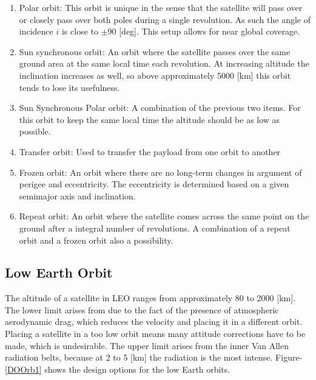 \begin{enumerate}
	\item Polar orbit:
	This orbit is unique in the sense that the satellite will pass over or closely pass over both poles during a single revolution. As such the angle of incidence $i$ is close to  $\pm$90 [deg]. This setup allows for near global coverage.
	\item Sun synchronous orbit:
	An orbit where the satellite passes over the same ground area at the same local time each revolution. At increasing altitude the inclination increases as well, so above approximately 5000 [km]\cite{larson} this orbit tends to lose its usefulness. 
	\item Sun Synchronous Polar orbit:
	A combination of the previous two items. For this orbit to keep the same local time the altitude should be as low as possible.
	\item Transfer orbit:
	Used to transfer the payload from one orbit to another
	\item Frozen orbit:
	An orbit where there are no long-term changes in argument of perigee and eccentricity. The eccentricity is determined based on a given semimajor axis and inclination.
	\item Repeat orbit:
	An orbit where the satellite comes across the same point on the ground after a integral number of revolutions. A combination of a repeat orbit and a frozen orbit also a possibility.
\end{enumerate}

\subsection{Low Earth Orbit}
\label{sec:blOrb1}
The altitude of a satellite in \acs{LEO} ranges from approximately 80 to 2000 [km]\cite{nasaOrbit}. The lower limit arises from due to the fact of the presence of atmospheric aerodynamic drag, which reduces the velocity and placing it in a different orbit. Placing a satellite in a too low orbit means many attitude corrections have to be made, which is undesirable. The upper limit arises from the inner Van Allen radiation belts, because at 2 to 5 [km]\cite{sse} the radiation is the most intense. Figure-\ref{DOOrb1} shows the design options for the low Earth orbits.

